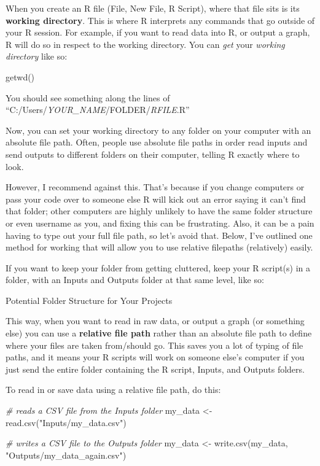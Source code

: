 \documentclass[
]{book}
\newenvironment{Shaded}{\begin{snugshade}}{\end{snugshade}}
\newcommand{\CommentTok}[1]{\textcolor[rgb]{0.56,0.35,0.01}{\textit{#1}}}
\newcommand{\FunctionTok}[1]{\textcolor[rgb]{0.00,0.00,0.00}{#1}}
\newcommand{\NormalTok}[1]{#1}
\newcommand{\OtherTok}[1]{\textcolor[rgb]{0.56,0.35,0.01}{#1}}
\newcommand{\StringTok}[1]{\textcolor[rgb]{0.31,0.60,0.02}{#1}}
\begin{document}
When you create an R file (File, New File, R Script), where that file sits is its \textbf{working directory}. This is where R interprets any commands that go outside of your R session. For example, if you want to read data into R, or output a graph, R will do so in respect to the working directory. You can \emph{get} your \emph{working directory} like so:

\begin{Shaded}
\begin{Highlighting}[]
\FunctionTok{getwd}\NormalTok{()}
\end{Highlighting}
\end{Shaded}

You should see something along the lines of ``C:/Users/\emph{YOUR\_NAME}/FOLDER/\emph{RFILE}.R''

Now, you can set your working directory to any folder on your computer with an absolute file path. Often, people use absolute file paths in order read inputs and send outputs to different folders on their computer, telling R exactly where to look.

However, I recommend against this. That's because if you change computers or pass your code over to someone else R will kick out an error saying it can't find that folder; other computers are highly unlikely to have the same folder structure or even username as you, and fixing this can be frustrating. Also, it can be a pain having to type out your full file path, so let's avoid that. Below, I've outlined one method for working that will allow you to use relative filepaths (relatively) easily.

If you want to keep your folder from getting cluttered, keep your R script(s) in a folder, with an Inputs and Outputs folder at that same level, like so:

Potential Folder Structure for Your Projects

This way, when you want to read in raw data, or output a graph (or something else) you can use a \textbf{relative file path} rather than an absolute file path to define where your files are taken from/should go. This saves you a lot of typing of file paths, and it means your R scripts will work on someone else's computer if you just send the entire folder containing the R script, Inputs, and Outputs folders.

To read in or save data using a relative file path, do this:

\begin{Shaded}
\begin{Highlighting}[]
\CommentTok{\# reads a CSV file from the Inputs folder}
\NormalTok{my\_data }\OtherTok{\textless{}{-}} \FunctionTok{read.csv}\NormalTok{(}\StringTok{"Inputs/my\_data.csv"}\NormalTok{) }

\CommentTok{\# writes a CSV file to the Outputs folder}
\NormalTok{my\_data }\OtherTok{\textless{}{-}} \FunctionTok{write.csv}\NormalTok{(my\_data, }\StringTok{"Outputs/my\_data\_again.csv"}\NormalTok{) }
\end{Highlighting}
\end{Shaded}
\end{document}
